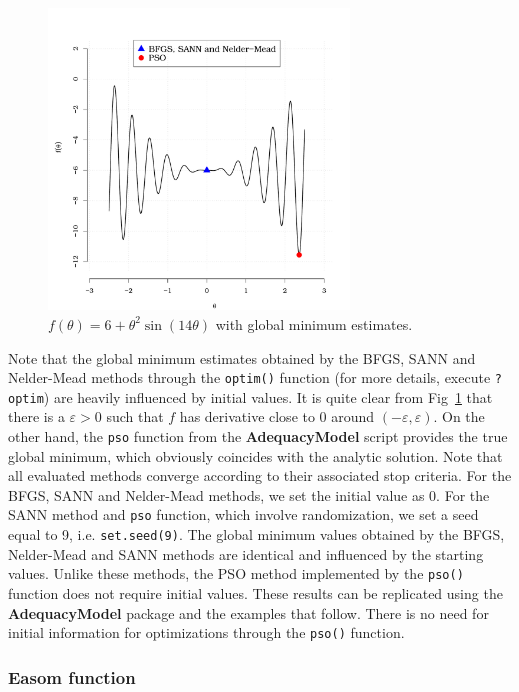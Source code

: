 \documentclass[10pt,letterpaper]{article}
\begin{document}
\begin{figure}[H]
\centering
\includegraphics[width=8cm,height=8cm]{plot_f}
\caption{$f(\theta) = 6 + \theta^2 \sin(14\theta)$ with global minimum estimates.}
\label{fig:f}
\end{figure}

Note that the global minimum estimates obtained by the BFGS, SANN and Nelder-Mead methods through the \texttt{optim()} function (for more details, execute \texttt{?optim}) are heavily influenced by initial values.
It is quite clear from Fig~\ref{fig:f} that there is a $\varepsilon >0$
such that $f$ has derivative close to 0 around $(-\varepsilon, \varepsilon)$.
On the other hand, the \texttt{pso} function from the
\textbf{AdequacyModel} script provides the true global minimum, which obviously coincides with the analytic solution.
Note that all evaluated methods converge according to their associated stop criteria.
For the BFGS, SANN and Nelder-Mead methods, we set the initial value as 0.
For the SANN method and \texttt{pso} function, which involve randomization, we set a seed equal to 9, i.e. \texttt{set.seed(9)}.
The global minimum values obtained by the BFGS, Nelder-Mead and SANN methods are identical and influenced by the starting values.
Unlike these methods, the PSO method implemented by the \texttt{pso()} function does not require initial values.
These results can be replicated using the \textbf{AdequacyModel} package and the examples that follow.
There is no need for initial information for optimizations through the \texttt{pso()} function.



\subsubsection{Easom function}
\end{document}
